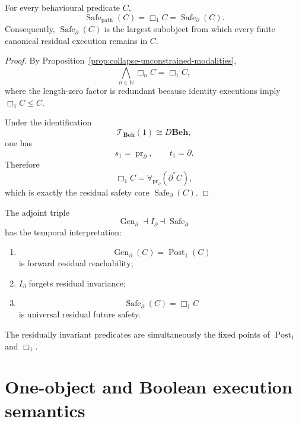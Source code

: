 \begin{theorem}
\label{thm:safety-core-universal-finite-path-safety}
For every behavioural predicate \(C\),
\[
    \operatorname{Safe}_{\mathrm{path}}(C)
    =
    \Box_1C
    =
    \operatorname{Safe}_{\partial}(C).
\]
Consequently, \(\operatorname{Safe}_{\partial}(C)\) is the largest subobject
from which every finite canonical residual execution remains in \(C\).
\end{theorem}

\begin{proof}
By
Proposition~\ref{prop:collapse-unconstrained-modalities},
\[
    \bigwedge_{n\in\mathbb N}\Box_nC
    =
    \Box_1C,
\]
where the length-zero factor is redundant because identity executions imply
\(\Box_1C\leq C\).

Under the identification
\[
    \mathscr T_{\mathbf{Beh}}(1)\cong D\mathbf{Beh},
\]
one has
\[
    s_1=\operatorname{pr}_\partial,
    \qquad
    t_1=\partial.
\]
Therefore
\[
    \Box_1C
    =
    \forall_{\operatorname{pr}_\partial}(\partial^\ast C),
\]
which is exactly the residual safety core
\(\operatorname{Safe}_{\partial}(C)\).
\end{proof}

\begin{corollary}
\label{cor:execution-meaning-derivative-adjoint-triple}
The adjoint triple
\[
    \operatorname{Gen}_{\partial}
    \dashv
    I_{\partial}
    \dashv
    \operatorname{Safe}_{\partial}
\]
has the temporal interpretation:
\begin{enumerate}
    \item
    \[
        \operatorname{Gen}_{\partial}(C)
        =
        \operatorname{Post}_1(C)
    \]
    is forward residual reachability;
    \item \(I_\partial\) forgets residual invariance;
    \item
    \[
        \operatorname{Safe}_{\partial}(C)
        =
        \Box_1C
    \]
    is universal residual future safety.
\end{enumerate}
The residually invariant predicates are simultaneously the fixed points of
\(\operatorname{Post}_1\) and \(\Box_1\).
\end{corollary}

\section{One-object and Boolean execution semantics}
\label{sec:one-object-boolean-execution}

